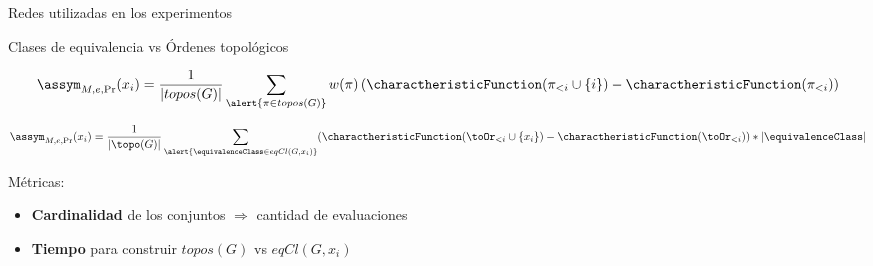 \begin{frame}{Redes utilizadas en los experimentos}
\begin{figure}[ht]
		\label{fig:bayesian_networks_combined}
	\end{figure}
\end{frame}

\begin{frame}{Clases de equivalencia vs \'Ordenes topol\'ogicos}
	\begin{mydefinition}
		\[
			\assym_{M,e,\Pr}(x_i) = \frac{1}{|topos(G)|} \sum_{\alert{\pi \in topos(G)}} w(\pi) \left( \charactheristicFunction(\pi_{<i} \cup \{i\}) - \charactheristicFunction(\pi_{<i}) \right)
		\]
	\end{mydefinition}
	\begin{mydefinition}
		\[
		\assym_{M,e,\Pr}(x_i) =\frac{1}{|\topo(G)|} \sum_{\alert{\equivalenceClass \in eqCl(G, x_i)}} (\charactheristicFunction(\toOr_{<i} \cup \{x_i\}) - \charactheristicFunction(\toOr_{<i})) * |\equivalenceClass|
		\]
	\end{mydefinition}
	\pause
	\vspace{-10px}
	M\'etricas:
	\begin{itemize}[<+->]
		\item \textbf{Cardinalidad} de los conjuntos $\Rightarrow$ cantidad de evaluaciones %
		\item \textbf{Tiempo} para construir $topos(G)$ vs $eqCl(G,x_i)$
	\end{itemize}
\end{frame}


